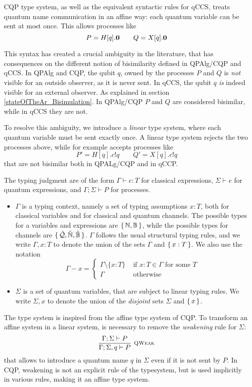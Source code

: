 CQP type system, as well as the equivalent syntactic rules for qCCS, treats quantum name communication in an affine way: each quantum variable can be sent at most once. This allows processes like 
\[ P = H[q].\mathbf{0} \qquad Q = X[q].\mathbf{0}\]

This syntax has created a crucial ambiguity in the literature, that has consequences on the different notion of bisimilarity defined in QPAlg/CQP and qCCS. In QPAlg and CQP, the qubit $q$, owned by the processes $P$ and $Q$ is \textit{not} visible for an outside observer, as it is never sent. In qCCS, the qubit $q$ \textit{is} indeed visible for an external observer. As explained in section \ref{stateOfTheAr_Bisimulation}. In QPAlg/CQP $P$ and $Q$ are considered bisimilar, while in qCCS they are not.

To resolve this ambiguity, we introduce a \textit{linear} type system, where each quantum variable must be sent exactly once. A linear type system rejects the two processes above, while for example accepts processes like
\[P' = H[q].c!q \qquad Q' = X[q].c!q\]
that are not bisimilar both in QPALg/CQP and in qCCP.

The typing judgment are of the form $\Gamma \vdash e : T$ for classical expressions, $\Sigma \vdash e$ for quantum expressions, and $\Gamma; \Sigma \vdash P$ for processes.
\begin{itemize}
\item $\Gamma$ is a typing context, namely a set of typing assumptions $x:T$, both for classical variables and for classical and quantum channels. The possible types for a variables and expressions are $\set{\mathbb{N}, \mathbb{B}}$, while the possible types for channels are $\set{\hat{\mathcal{Q}}, \hat{\mathbb{N}}, \hat{\mathbb{B}}}$. $\Gamma$ follows the usual structural typing rules, and we write $\Gamma, x: T$ to denote the union of the sets $\Gamma$ and $\set{x: T}$. We also use the notation
\[\Gamma - x = \begin{cases}
\Gamma \setminus \{x : T\} &\text{ if } x: T \in \Gamma \text{ for some } T \\
\Gamma &\text{ otherwise}
\end{cases}\]
\item $\Sigma$ is a set of quantum variables, that are subject to linear typing rules. We write $\Sigma, x$ to denote the union of the \textit{disjoint} sets $\Sigma$ and $\set{x}$.
\end{itemize}

The type system is inspired from the affine type system of CQP. To transform an affine system in a linear system, is necessary to remove the \textit{weakening} rule for $\Sigma$:
\[ \infer[\mbox{\footnotesize\scshape QWeak}]{\Gamma; \Sigma,q \vdash P}{\Gamma; \Sigma \vdash P}
\]
that allows to introduce a quantum name $q$ in $\Sigma$ even if it is not sent by $P$. In CQP, weakening is not an explicit rule of the typesystem, but is used implicitly in various rules, making it an affine type system.

